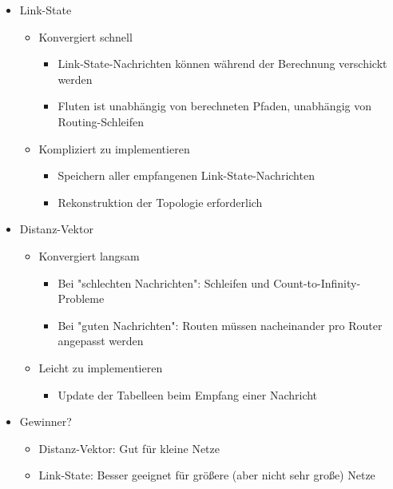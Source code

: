       \begin{itemize}
        \item Link-State
          \begin{itemize}
            \item Konvergiert schnell
              \begin{itemize}
                \item Link-State-Nachrichten können während der Berechnung verschickt werden
                \item Fluten ist unabhängig von berechneten Pfaden, unabhängig von Routing-Schleifen
              \end{itemize}
            \item Kompliziert zu implementieren
              \begin{itemize}
                \item Speichern aller empfangenen Link-State-Nachrichten
                \item Rekonstruktion der Topologie erforderlich
              \end{itemize}
          \end{itemize}
        \item Distanz-Vektor
          \begin{itemize}
            \item Konvergiert langsam
              \begin{itemize}
                \item Bei "schlechten Nachrichten": Schleifen und Count-to-Infinity-Probleme
                \item Bei "guten Nachrichten": Routen müssen nacheinander pro Router angepasst werden
              \end{itemize}
            \item Leicht zu implementieren
              \begin{itemize}
                \item Update der Tabelleen beim Empfang einer Nachricht
              \end{itemize}
          \end{itemize}
        \item Gewinner?
          \begin{itemize}
            \item Distanz-Vektor: Gut für kleine Netze
            \item Link-State: Besser geeignet für größere (aber nicht sehr große) Netze
          \end{itemize}
      \end{itemize}
